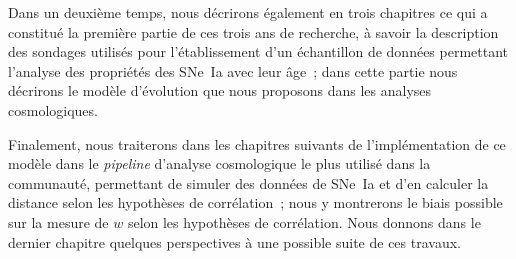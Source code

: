 \documentclass[../main/main.tex]{subfiles}
\begin{document}
Dans un deuxième temps, nous décrirons également en trois chapitres ce qui a
constitué la première partie de ces trois ans de recherche, à savoir la
description des sondages utilisés pour l'établissement d'un échantillon de
données permettant l'analyse des propriétés des SNe~Ia avec leur âge~; dans
cette partie nous décrirons le modèle d'évolution que nous proposons dans les
analyses cosmologiques.

Finalement, nous traiterons dans les chapitres suivants de l'implémentation de
ce modèle dans le \textit{pipeline} d'analyse cosmologique le plus utilisé dans
la communauté, permettant de simuler des données de SNe~Ia et d'en calculer la
distance selon les hypothèses de corrélation~; nous y montrerons le biais
possible sur la mesure de $w$ selon les hypothèses de corrélation. Nous donnons
dans le dernier chapitre quelques perspectives à une possible suite de ces
travaux.


\shorthandoff{:}

\end{document}
